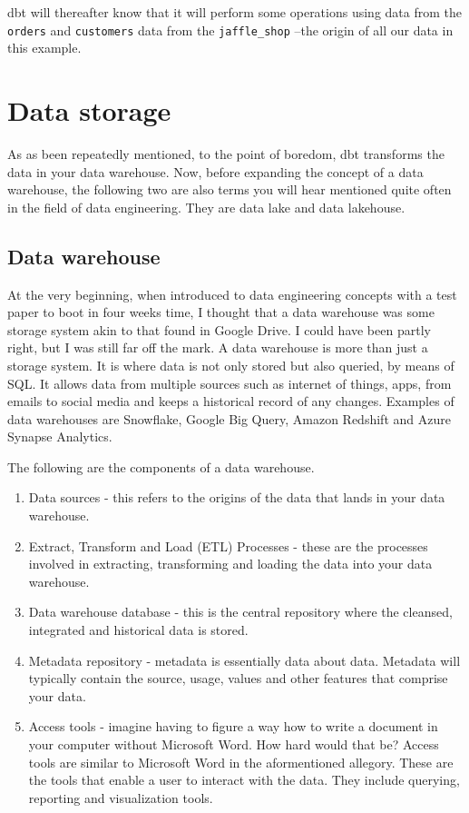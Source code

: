 \documentclass[
]{book}
\begin{document}
dbt will thereafter know that it will perform some operations using data from the \texttt{orders} and \texttt{customers} data from the \texttt{jaffle\_shop} --the origin of all our data in this example.

\hypertarget{data-storage}{%
\chapter{Data storage}\label{data-storage}}

As as been repeatedly mentioned, to the point of boredom, dbt transforms the data in your data warehouse. Now, before expanding the concept of a data warehouse, the following two are also terms you will hear mentioned quite often in the field of data engineering. They are data lake and data lakehouse.

\hypertarget{data-warehouse}{%
\section{Data warehouse}\label{data-warehouse}}

At the very beginning, when introduced to data engineering concepts with a test paper to boot in four weeks time, I thought that a data warehouse was some storage system akin to that found in Google Drive. I could have been partly right, but I was still far off the mark. A data warehouse is more than just a storage system. It is where data is not only stored but also queried, by means of SQL. It allows data from multiple sources such as internet of things, apps, from emails to social media and keeps a historical record of any changes. Examples of data warehouses are Snowflake, Google Big Query, Amazon Redshift and Azure Synapse Analytics.

The following are the components of a data warehouse.

\begin{enumerate}
\def\labelenumi{\arabic{enumi}.}
\item
  Data sources - this refers to the origins of the data that lands in your data warehouse.
\item
  Extract, Transform and Load (ETL) Processes - these are the processes involved in extracting, transforming and loading the data into your data warehouse.
\item
  Data warehouse database - this is the central repository where the cleansed, integrated and historical data is stored.
\item
  Metadata repository - metadata is essentially data about data. Metadata will typically contain the source, usage, values and other features that comprise your data.
\item
  Access tools - imagine having to figure a way how to write a document in your computer without Microsoft Word. How hard would that be? Access tools are similar to Microsoft Word in the aformentioned allegory. These are the tools that enable a user to interact with the data. They include querying, reporting and visualization tools.
\end{enumerate}
\end{document}
